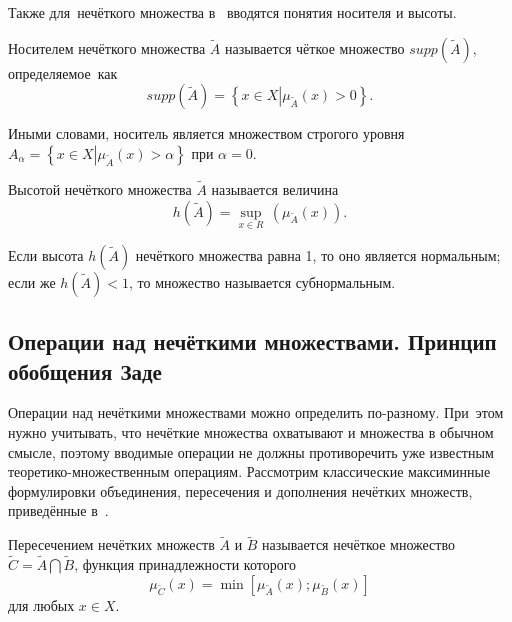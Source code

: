 Также для~нечёткого множества в~\cite{Pospelov, Rutkovskaya, Yakhyaeva} вводятся понятия носителя и высоты.
\begin{mydef}
Носителем нечёткого множества $\tilde{A}$ называется чёткое множество $supp\left( {\tilde{A}} \right)$, определяемое~как
\begin{equation}
\label{eq:support}
	supp\left( \tilde A \right)=\left\{ x\in X \left| \mu_{\tilde A}\left( x \right)>0 \right. \right\}.
\end{equation}
\end{mydef}
Иными словами, носитель является множеством строгого уровня $A_\alpha= \left\{ x\in X \left| \mu_{\tilde A}\left( x \right)> \alpha \right. \right\}$ при $\alpha = 0$.

\begin{mydef}
Высотой нечёткого множества $\tilde A$ называется величина
\begin{equation}
\label{eq:number-height}
	h \left( \tilde A \right)= \underset{x\in R}{\mathop {\sup}} {}\, \left( \mu_{\tilde A} \left( x \right) \right).
\end{equation}
\end{mydef}
Если высота $h\left( \tilde A \right)$ нечёткого множества равна 1, то оно является нормальным; если же $h\left( \tilde A \right) < 1$, то множество называется субнормальным.

\subsection{Операции над нечёткими множествами. Принцип обобщения Заде}
Операции над нечёткими множествами можно определить по-разному. При~этом нужно учитывать, что нечёткие множества охватывают и множества в обычном смысле, поэтому вводимые операции не должны противоречить уже известным теоретико-множественным операциям. Рассмотрим классические максиминные формулировки объединения, пересечения и дополнения нечётких множеств, приведённые в~\cite{Rutkovskaya, Orlovskiy, Borisov_Alexeev_Msk, Borisov_Krumberg_Riga, Kaufmann}.
\begin{mydef}
Пересечением нечётких множеств $\tilde{A}$ и $\tilde{B}$ называется нечёткое множество $\displaystyle \tilde{C}=\tilde{A}\bigcap \tilde{B}$, функция принадлежности которого
\begin{equation}
\label{eq:fuzzy-cross}
	{{\mu }_{{\tilde{C}}}}\left( x \right)=\min \left[ {{\mu }_{{\tilde{A}}}}\left( x \right);{{\mu }_{{\tilde{B}}}}\left( x \right) \right]
\end{equation}
для любых $x\in X$.
\end{mydef}

